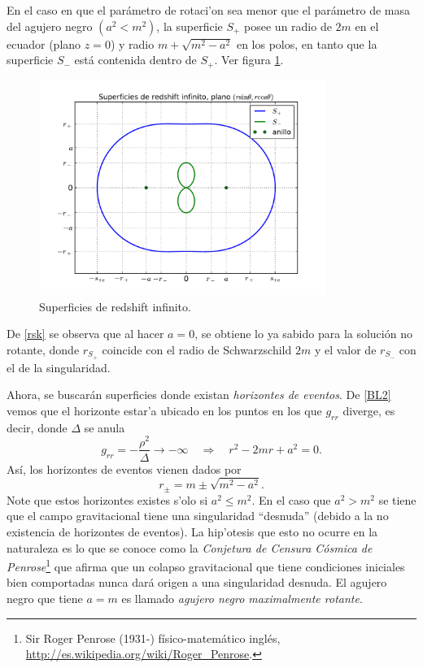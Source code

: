 En el caso en que el par\'ametro de rotaci'on sea menor que el par\'ametro de masa del agujero negro $(a^2<m^2)$, la superficie $S_{+}$ posee un radio de $2m$ en el ecuador (plano $z=0$) y radio $m+\sqrt{m^2-a^2}$ en los polos, en tanto que la superficie $S_{-}$ est\'a contenida dentro de $S_{+}$. Ver figura \ref{fig:surface1}.
\begin{figure}[H]
 \centering
\includegraphics[height=7cm,angle=0]{fig/fig-surface1.pdf}
\caption{Superficies de redshift infinito.}
\label{fig:surface1}
\end{figure}
De \eqref{rsk} se observa que al hacer $a=0$, se obtiene lo ya sabido para la soluci\'on no rotante, donde $r_{S_{+}}$ coincide con el radio de
Schwarzschild $2m$ y el valor de $r_{S_{-}}$ con el de la singularidad.

Ahora, se buscar\'an superficies donde existan \textit{horizontes de eventos}. De \eqref{BL2} vemos que el horizonte estar'a ubicado en los puntos en los que $g_{rr}$ diverge, es decir, donde $\Delta$ se anula
\begin{equation}\label{grr}
g_{rr}=-\frac{\rho^2}{\Delta}\rightarrow -\infty \quad\Rightarrow\quad r^2-2mr+a^2=0.
\end{equation}
As\'i, los horizontes de eventos vienen dados por
\begin{equation}\label{horizontes}
\boxed{r_{\pm}=m\pm\sqrt{m^2-a^2}.}
\end{equation}
Note que estos horizontes existes s'olo si $a^2\leqslant m^2$. En el caso que $a^2>m^2$ se tiene que el campo gravitacional tiene una singularidad ``desnuda'' (debido a la no existencia de horizontes de eventos). La hip'otesis que esto no ocurre en la naturaleza es lo que se conoce como la \textit{Conjetura de Censura C\'osmica de Penrose}\footnote{Sir Roger Penrose (1931-) f\'isico-matem\'atico ingl\'es, \url{http://es.wikipedia.org/wiki/Roger_Penrose}.} que afirma que un colapso gravitacional que tiene condiciones iniciales bien comportadas nunca dar\'a origen a una singularidad desnuda. El agujero negro que tiene $a=m$ es llamado \textit{agujero negro maximalmente rotante}.\\

